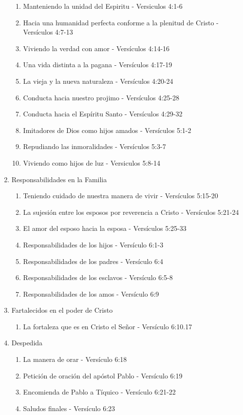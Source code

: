 \documentclass[9pt,letterpaper]{article}
\begin{document}
\begin{enumerate}
		\begin{enumerate}			
			\item Manteniendo la unidad del Espiritu - Versiculos 4:1-6			 
			\item Hacia una humanidad perfecta conforme a la plenitud de Cristo - Versículos 4:7-13
			\item Viviendo la verdad con amor - Versículos 4:14-16
			\item Una vida distinta a la pagana - Versículos 4:17-19
			\item La vieja y la nueva naturaleza - Versículos 4:20-24
			\item Conducta hacia nuestro projimo - Versículos 4:25-28
			\item Conducta hacia el Espíritu Santo - Versículos 4:29-32
			\item Imitadores de Dios como hijos amados - Versículos 5:1-2
			\item Repudiando las inmoralidades - Versículos 5:3-7
			\item Viviendo como hijos de luz - Versiculos 5:8-14
		\end{enumerate}
			\item {\large Responsabilidades en la Familia}
		\begin{enumerate}
			\item Teniendo cuidado de nuestra manera de vivir - Versículos 5:15-20
			\item La sujesión entre los esposos por reverencia a Cristo - Versículos 5:21-24
			\item El amor del esposo hacia la esposa - Versículos 5:25-33
			\item Responsabilidades de los hijos - Versículo 6:1-3
			\item Responsabilidades de los padres - Versículo 6:4
			\item Responsabilidades de los esclavos - Versículo 6:5-8
			\item Responsabilidades de los amos - Versículo 6:9
		\end{enumerate}
		\item {\large Fartalecidos en el poder de Cristo}
		\begin{enumerate}			
			\item  La fortaleza que es en Cristo el Señor - Versículo 6:10.17		
		\end{enumerate}
		\item {\large Despedida}
		\begin{enumerate}
			\item La manera de orar - Versículo 6:18
			\item Petición de oración del apóstol Pablo - Versículo 6:19
			\item Encomienda de Pablo a Tíquico - Versículo 6:21-22
			\item Saludos finales - Versículo 6:23
		\end{enumerate}
		
	
	\end{enumerate}
\end{document}
